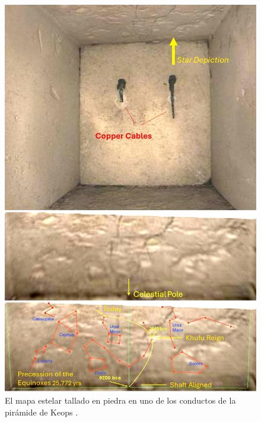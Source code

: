 \documentclass[10pt,twocolumn,letterpaper]{article}
\begin{document}
\begin{figure}[H]
\begin{center}

   \includegraphics[width=1\linewidth]{star-stone.jpg}
\end{center}
   \caption{El mapa estelar tallado en piedra en uno de los conductos de la pirámide de Keops \cite{28}.}
\label{fig:20}
\label{fig:onecol}
\end{figure}
\end{document}
